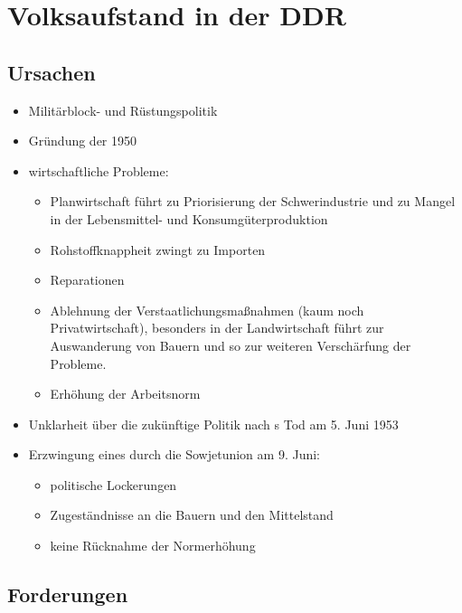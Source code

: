 \section[Volksaufstand in der DDR]{Volksaufstand in der
DDR}

\subsection*{Ursachen}

\begin{itemize}
\item Militärblock- und Rüstungspolitik

\item Gründung der  1950 

\item wirtschaftliche Probleme:
\begin{itemize}
\item Planwirtschaft führt zu Priorisierung der Schwerindustrie und zu
Mangel in der Lebensmittel- und Konsumgüterproduktion
\item Rohstoffknappheit zwingt zu Importen
\item Reparationen
\item Ablehnung der Verstaatlichungsmaßnahmen (kaum noch
Privatwirtschaft), besonders in der Landwirtschaft führt zur
Auswanderung von Bauern und so zur weiteren
Verschärfung der Probleme.
\item Erhöhung der Arbeitsnorm
\end{itemize}

\item Unklarheit über die zukünftige Politik nach s Tod am 5. Juni 1953

\item Erzwingung eines  durch die Sowjetunion am 9.
Juni:
\begin{itemize}
\item politische Lockerungen
\item Zugeständnisse an die Bauern und den Mittelstand
\item keine Rücknahme der Normerhöhung
\end{itemize}
\end{itemize}


\subsection*{Forderungen}

